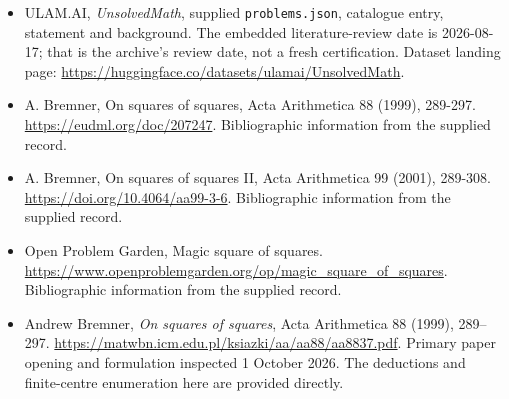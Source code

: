 \documentclass[11pt,a4paper]{article}
\begin{document}
{\small

\begin{itemize}

\item[\hypertarget{source:statement:1}{S1}] ULAM.AI, \emph{UnsolvedMath}, supplied \texttt{problems.json}, catalogue entry, statement and background. The embedded literature-review date is 2026-08-17; that is the archive’s review date, not a fresh certification. Dataset landing page: \url{https://huggingface.co/datasets/ulamai/UnsolvedMath}.

\item[\hypertarget{source:statement:2}{S2}] A. Bremner, On squares of squares, Acta Arithmetica 88 (1999), 289-297. \url{https://eudml.org/doc/207247}. Bibliographic information from the supplied record.

\item[\hypertarget{source:statement:3}{S3}] A. Bremner, On squares of squares II, Acta Arithmetica 99 (2001), 289-308. \url{https://doi.org/10.4064/aa99-3-6}. Bibliographic information from the supplied record.

\item[\hypertarget{source:statement:4}{S4}] Open Problem Garden, Magic square of squares. \url{https://www.openproblemgarden.org/op/magic_square_of_squares}. Bibliographic information from the supplied record.


\item[E1] Andrew Bremner, \emph{On squares of squares},
Acta Arithmetica 88 (1999), 289--297.
\url{https://matwbn.icm.edu.pl/ksiazki/aa/aa88/aa8837.pdf}.
Primary paper opening and formulation inspected 1 October 2026.
The deductions and finite-centre enumeration here are provided directly.

\end{itemize}

}

\label{end:statement}
\end{document}
